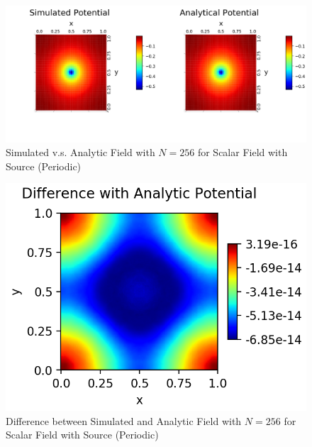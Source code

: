 \documentclass[a4paper,10pt]{article}
\begin{document}
\begin{large}
\begin{figure}[htbp] %
\centering %
\includegraphics[width=15cm]{Problem_3_Simulated_v.s._Analytic_Potential_N=256_criteria=1.00000000e-21_with_Charge_Periodic.png} %
\caption{Simulated v.s. Analytic Field with $N=256$ for Scalar Field with Source (Periodic)}
\end{figure}

\begin{figure}[htbp] %
\centering %
\includegraphics[width=13cm]{Problem_3_Simulated_v.s._Analytic_Potential_Difference_N=256_criteria=1.00000000e-21_with_Charge_Periodic.png} %
\caption{Difference between Simulated and Analytic Field with $N=256$ for Scalar Field with Source (Periodic)}
\end{figure}

\end{large}
\end{document}
